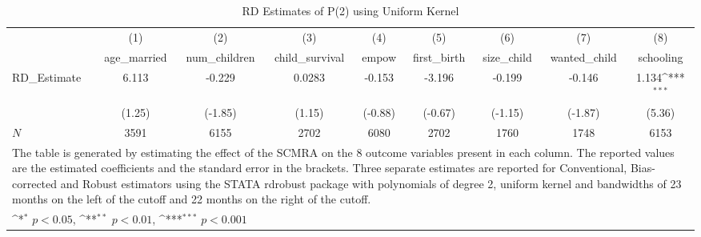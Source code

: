 \begin{table}[htbp]\centering
\def\sym#1{\ifmmode^{#1}\else\(^{#1}\)\fi}
\caption{RD Estimates of P(2) using Uniform Kernel}
\begin{tabular}{l*{8}{c}}
\toprule
            &\multicolumn{1}{c}{(1)}&\multicolumn{1}{c}{(2)}&\multicolumn{1}{c}{(3)}&\multicolumn{1}{c}{(4)}&\multicolumn{1}{c}{(5)}&\multicolumn{1}{c}{(6)}&\multicolumn{1}{c}{(7)}&\multicolumn{1}{c}{(8)}\\
            &\multicolumn{1}{c}{age\_married}&\multicolumn{1}{c}{num\_children}&\multicolumn{1}{c}{child\_survival}&\multicolumn{1}{c}{empow}&\multicolumn{1}{c}{first\_birth}&\multicolumn{1}{c}{size\_child}&\multicolumn{1}{c}{wanted\_child}&\multicolumn{1}{c}{schooling}\\
\midrule
RD\_Estimate &       6.113         &      -0.229         &      0.0283         &      -0.153         &      -3.196         &      -0.199         &      -0.146         &       1.134\sym{***}\\
            &      (1.25)         &     (-1.85)         &      (1.15)         &     (-0.88)         &     (-0.67)         &     (-1.15)         &     (-1.87)         &      (5.36)         \\
\midrule
\(N\)       &        3591         &        6155         &        2702         &        6080         &        2702         &        1760         &        1748         &        6153         \\
\bottomrule
\multicolumn{9}{l}{\footnotesize The table is generated by estimating the effect of the SCMRA on the 8 outcome variables present in each column. The reported values are the estimated coefficients and the standard error in the brackets. Three separate estimates are reported for Conventional, Bias-corrected and Robust estimators using the STATA rdrobust package with polynomials of degree 2, uniform kernel and bandwidths of 23 months on the left of the cutoff and 22 months on the right of the cutoff.}\\
\multicolumn{9}{l}{\footnotesize \sym{*} \(p<0.05\), \sym{**} \(p<0.01\), \sym{***} \(p<0.001\)}\\
\end{tabular}
\end{table}
